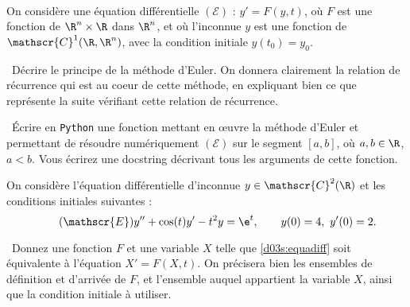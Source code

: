 \exer{[EQD-000]}
\setcounter{numques}{0}~\\

On considère une équation différentielle $(\mathscr{E})$ : $y' = F(y,t)$, où $F$ est une fonction de $\R^n \times \R$ dans 
$\R^n$, et où l'inconnue $y$ est une fonction de $\mathscr{C}^1(\R,\R^n)$, avec la condition initiale $y(t_0) = y_0$.

\medskip

\question\ Décrire le principe de la méthode d'Euler. On donnera clairement la relation de récurrence qui est au coeur de 
cette méthode, en expliquant bien ce que représente la suite vérifiant cette relation de récurrence.

\medskip 

\question\ Écrire en \texttt{Python} une fonction mettant en \oe uvre la méthode d'Euler  et permettant de résoudre numériquement $(\mathscr{E})$ sur le segment 
$[a,b]$, 
où $a,b\in\R$, $a<b$. Vous écrirez une docstring décrivant tous les arguments de cette fonction.

\medskip

On considère l'équation différentielle d'inconnue $y\in\mathscr{C}^2(\R)$ et les conditions initiales suivantes : 
\begin{equation}\tag{$\mathscr{E}$}\label{d03s:equadiff}
  y''+\cos(t) y' - t^2 y = \e^t,\qquad y(0) = 4,~ y'(0) = 2. 
\end{equation}

\question\ Donnez une fonction $F$ et une variable $X$ telle que \eqref{d03s:equadiff} soit équivalente à l'équation $X'=F(X,t)$. On précisera bien 
les ensembles de définition et d'arrivée de $F$, et l'ensemble auquel appartient la variable $X$, ainsi que la condition initiale à utiliser.